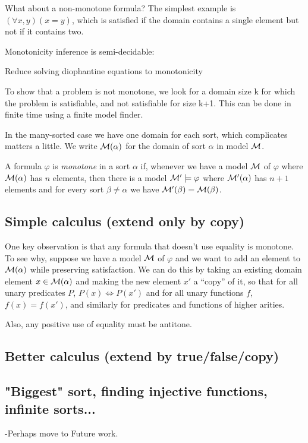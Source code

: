 What about a non-monotone formula? The simplest example is $(\forall
x, y)(x = y)$, which is satisfied if the domain contains a single
element but not if it contains two.





Monotonicity inference is semi-decidable:

Reduce solving diophantine equations to monotonicity

To show that a problem is not monotone, we look for a domain size
k for which the problem is satisfiable, and not satisfiable for size k+1.
This can be done in finite time using a finite model finder.



In the many-sorted case we have one domain for each sort, which
complicates matters a little. We write $\mathcal{M}(\alpha)$ for the domain of
sort $\alpha$ in model $\mathcal{M}$.

\begin{definition}
A formula $\varphi$ is \emph{monotone} in a sort $\alpha$ if,
whenever we have a model $\mathcal{M}$ of $\varphi$ where $\mathcal{M}(\alpha)$ has $n$
elements, then there is a model $\mathcal{M}' \models \varphi$ where
$\mathcal{M}'(\alpha)$ has $n+1$ elements and for every sort $\beta \neq
\alpha$ we have $\mathcal{M}'(\beta) = \mathcal{M}(\beta)$.
\end{definition}

\subsection{Simple calculus (extend only by copy)}

One key observation is that any formula that doesn't use equality is
monotone. To see why, suppose we have a model $\mathcal{M}$ of $\varphi$ and we
want to add an element to $\mathcal{M}(\alpha)$ while preserving satisfaction.
We can do this by taking an existing domain element $x \in \mathcal{M}(\alpha)$
and making the new element $x'$ a ``copy'' of it, so that for all
unary predicates $P$, $P(x) \iff P(x')$ and for all unary functions
$f$, $f(x) = f(x')$, and similarly for predicates and functions of
higher arities.

Also, any positive use of equality must be antitone.

\subsection{Better calculus (extend by true/false/copy)}

\subsection{ "Biggest" sort, finding injective functions, infinite sorts...}

-Perhaps move to Future work.
